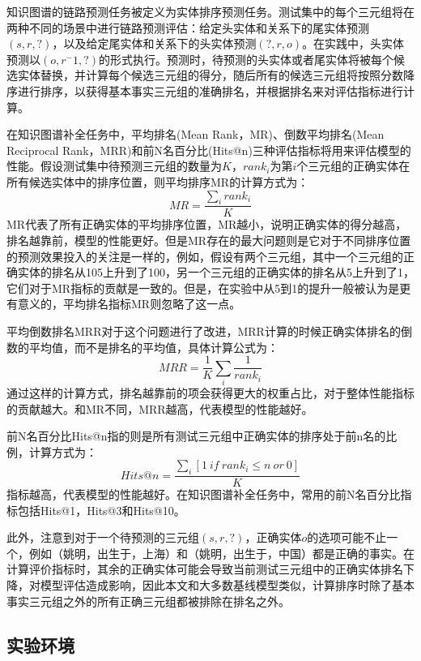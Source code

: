 知识图谱的链路预测任务被定义为实体排序预测任务。测试集中的每个三元组将在两种不同的场景中进行链路预测评估：给定头实体和关系下的尾实体预测$(s,r,?)$，以及给定尾实体和关系下的头实体预测$(?,r,o)$。在实践中，头实体预测以$(o,r^-1,?)$的形式执行。预测时，待预测的头实体或者尾实体将被每个候选实体替换，并计算每个候选三元组的得分，随后所有的候选三元组将按照分数降序进行排序，以获得基本事实三元组的准确排名，并根据排名来对评估指标进行计算。

在知识图谱补全任务中，平均排名(Mean Rank，MR)、倒数平均排名(Mean Reciprocal Rank，MRR)和前N名百分比(Hits@n)三种评估指标将用来评估模型的性能。假设测试集中待预测三元组的数量为$K$，$rank_i$为第$i$个三元组的正确实体在所有候选实体中的排序位置，则平均排序MR的计算方式为：
\begin{equation}
    MR = \frac{\sum_i rank_i}{K}
\end{equation}
MR代表了所有正确实体的平均排序位置，MR越小，说明正确实体的得分越高，排名越靠前，模型的性能更好。但是MR存在的最大问题则是它对于不同排序位置的预测效果投入的关注是一样的，例如，假设有两个三元组，其中一个三元组的正确实体的排名从105上升到了100，另一个三元组的正确实体的排名从5上升到了1，它们对于MR指标的贡献是一致的。但是，在实验中从5到1的提升一般被认为是更有意义的，平均排名指标MR则忽略了这一点。

平均倒数排名MRR对于这个问题进行了改进，MRR计算的时候正确实体排名的倒数的平均值，而不是排名的平均值，具体计算公式为：
\begin{equation}
    MRR = \frac{1}{K} \sum_i \frac{1}{rank_i}
\end{equation}
通过这样的计算方式，排名越靠前的项会获得更大的权重占比，对于整体性能指标的贡献越大。和MR不同，MRR越高，代表模型的性能越好。

前N名百分比Hits@n指的则是所有测试三元组中正确实体的排序处于前n名的比例，计算方式为：
\begin{equation}
    Hits@n = \frac{\sum_i \left[1 \ if \ rank_i \leq n \ or \ 0\right] }{K}
\end{equation}
指标越高，代表模型的性能越好。在知识图谱补全任务中，常用的前N名百分比指标包括Hits@1，Hits@3和Hits@10。

此外，注意到对于一个待预测的三元组$(s,r,?)$，正确实体$o$的选项可能不止一个，例如（姚明，出生于，上海）和（姚明，出生于，中国）都是正确的事实。在计算评价指标时，其余的正确实体可能会导致当前测试三元组中的正确实体排名下降，对模型评估造成影响，因此本文和大多数基线模型类似，计算排序时除了基本事实三元组之外的所有正确三元组都被排除在排名之外。

\subsection{实验环境}

